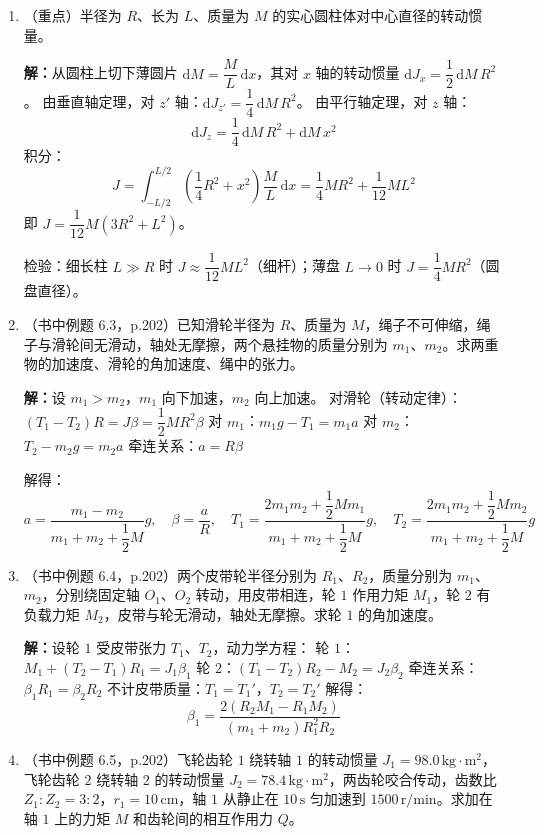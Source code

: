 \documentclass{ctexart}
\begin{document}
\begin{enumerate}
\item（重点）半径为 $R$、长为 $L$、质量为 $M$ 的实心圆柱体对中心直径的转动惯量。

\textbf{解：}从圆柱上切下薄圆片 $\mathrm{d}M = \dfrac{M}{L}\,\mathrm{d}x$，其对 $x$ 轴的转动惯量 $\mathrm{d}J_x = \dfrac12\,\mathrm{d}M\,R^{2}$。
由垂直轴定理，对 $z'$ 轴：$\mathrm{d}J_{z'} = \dfrac14\,\mathrm{d}M\,R^{2}$。
由平行轴定理，对 $z$ 轴：
\[
\mathrm{d}J_z = \frac14\,\mathrm{d}M\,R^{2} + \mathrm{d}M\,x^{2}
\]
积分：
\[
J = \int_{-L/2}^{L/2} \left(\frac14 R^{2} + x^{2}\right)\frac{M}{L}\,\mathrm{d}x
= \frac14 MR^{2} + \frac{1}{12}ML^{2}
\]
即 $J = \dfrac{1}{12}M(3R^{2} + L^{2})$。

检验：细长柱 $L \gg R$ 时 $J \approx \dfrac{1}{12}ML^{2}$（细杆）；薄盘 $L \to 0$ 时 $J = \dfrac14 MR^{2}$（圆盘直径）。

\item（书中例题 6.3，p.202）已知滑轮半径为 $R$、质量为 $M$，绳子不可伸缩，绳子与滑轮间无滑动，轴处无摩擦，两个悬挂物的质量分别为 $m_1$、$m_2$。求两重物的加速度、滑轮的角加速度、绳中的张力。

\textbf{解：}设 $m_1 > m_2$，$m_1$ 向下加速，$m_2$ 向上加速。
对滑轮（转动定律）：$(T_1 - T_2)R = J\beta = \dfrac12 MR^{2}\beta$
对 $m_1$：$m_1g - T_1 = m_1a$
对 $m_2$：$T_2 - m_2g = m_2a$
牵连关系：$a = R\beta$

解得：
\[
a = \frac{m_1 - m_2}{m_1 + m_2 + \dfrac12 M}g,\quad
\beta = \frac{a}{R},\quad
T_1 = \frac{2m_1m_2 + \dfrac12 Mm_1}{m_1 + m_2 + \dfrac12 M}g,\quad
T_2 = \frac{2m_1m_2 + \dfrac12 Mm_2}{m_1 + m_2 + \dfrac12 M}g
\]

\item（书中例题 6.4，p.202）两个皮带轮半径分别为 $R_1$、$R_2$，质量分别为 $m_1$、$m_2$，分别绕固定轴 $O_1$、$O_2$ 转动，用皮带相连，轮 $1$ 作用力矩 $M_1$，轮 $2$ 有负载力矩 $M_2$，皮带与轮无滑动，轴处无摩擦。求轮 $1$ 的角加速度。

\textbf{解：}设轮 $1$ 受皮带张力 $T_1$、$T_2$，动力学方程：
轮 $1$：$M_1 + (T_2 - T_1)R_1 = J_1\beta_1$
轮 $2$：$(T_1 - T_2)R_2 - M_2 = J_2\beta_2$
牵连关系：$\beta_1 R_1 = \beta_2 R_2$
不计皮带质量：$T_1 = T_1'$，$T_2 = T_2'$
解得：
\[
\beta_1 = \frac{2(R_2 M_1 - R_1 M_2)}{(m_1 + m_2)R_1^{2}R_2}
\]

\item（书中例题 6.5，p.202）飞轮齿轮 $1$ 绕转轴 $1$ 的转动惯量 $J_1 = 98.0\,\text{kg}\cdot\text{m}^{2}$，飞轮齿轮 $2$ 绕转轴 $2$ 的转动惯量 $J_2 = 78.4\,\text{kg}\cdot\text{m}^{2}$，两齿轮咬合传动，齿数比 $Z_1:Z_2 = 3:2$，$r_1 = 10\,\text{cm}$，轴 $1$ 从静止在 $10\,\text{s}$ 匀加速到 $1500\,\text{r/min}$。求加在轴 $1$ 上的力矩 $M$ 和齿轮间的相互作用力 $Q$。


\end{enumerate}
\end{document}
